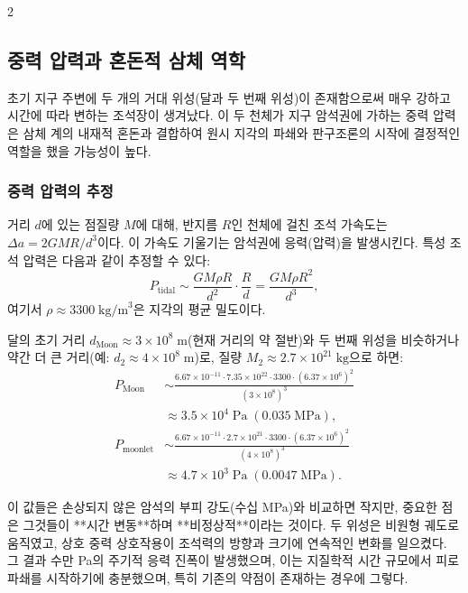 \documentclass[12pt,a4paper]{article}
\begin{document}
\begin{multicols}{2}
		\subsection{중력 압력과 혼돈적 삼체 역학}
		초기 지구 주변에 두 개의 거대 위성(달과 두 번째 위성)이 존재함으로써 매우 강하고 시간에 따라 변하는 조석장이 생겨났다. 이 두 천체가 지구 암석권에 가하는 중력 압력은 삼체 계의 내재적 혼돈과 결합하여 원시 지각의 파쇄와 판구조론의 시작에 결정적인 역할을 했을 가능성이 높다.
		
		\subsubsection{중력 압력의 추정}
		거리 \(d\)에 있는 점질량 \(M\)에 대해, 반지름 \(R\)인 천체에 걸친 조석 가속도는 \(\Delta a = 2GM R / d^{3}\)이다. 이 가속도 기울기는 암석권에 응력(압력)을 발생시킨다. 특성 조석 압력은 다음과 같이 추정할 수 있다:
		\[
		P_{\text{tidal}} \sim \frac{GM \rho R}{d^{2}} \cdot \frac{R}{d} = \frac{GM \rho R^{2}}{d^{3}},
		\]
		여기서 \(\rho \approx 3300\;\text{kg/m}^{3}\)은 지각의 평균 밀도이다.
		
		달의 초기 거리 \(d_{\text{Moon}} \approx 3\times10^{8}\;\text{m}\)(현재 거리의 약 절반)와 두 번째 위성을 비슷하거나 약간 더 큰 거리(예: \(d_{2} \approx 4\times10^{8}\;\text{m}\))로, 질량 \(M_{2} \approx 2.7\times10^{21}\;\text{kg}\)으로 하면:
		\[
		\begin{aligned}
			P_{\text{Moon}} &\sim \frac{6.67\times10^{-11} \cdot 7.35\times10^{22} \cdot 3300 \cdot (6.37\times10^{6})^{2}}{(3\times10^{8})^{3}} \\
			&\approx 3.5 \times 10^{4}\;\text{Pa} \;(0.035\;\text{MPa}),\\
			P_{\text{moonlet}} &\sim \frac{6.67\times10^{-11} \cdot 2.7\times10^{21} \cdot 3300 \cdot (6.37\times10^{6})^{2}}{(4\times10^{8})^{3}} \\
			&\approx 4.7 \times 10^{3}\;\text{Pa} \;(0.0047\;\text{MPa}).
		\end{aligned}
		\]
		
		이 값들은 손상되지 않은 암석의 부피 강도(수십 MPa)와 비교하면 작지만, 중요한 점은 그것들이 **시간 변동**하며 **비정상적**이라는 것이다. 두 위성은 비원형 궤도로 움직였고, 상호 중력 상호작용이 조석력의 방향과 크기에 연속적인 변화를 일으켰다. 그 결과 수만 Pa의 주기적 응력 진폭이 발생했으며, 이는 지질학적 시간 규모에서 피로 파쇄를 시작하기에 충분했으며, 특히 기존의 약점이 존재하는 경우에 그렇다.
		

\end{multicols}
\end{document}
